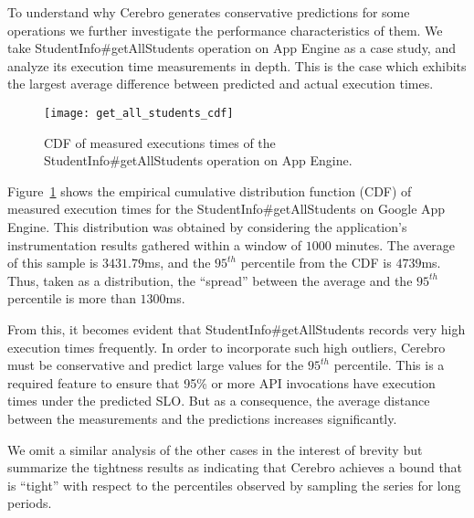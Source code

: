 To understand why Cerebro generates conservative predictions for some operations we further 
investigate the performance characteristics of them. We take StudentInfo\#getAllStudents
operation on App Engine as a case study, and analyze its execution time measurements in depth. 
This is the case which exhibits the largest average difference between predicted and actual execution times.

\begin{figure}
\centering
\texttt{[image: get\_all\_students\_cdf]}
\caption{CDF of measured executions times of the StudentInfo\#getAllStudents operation on App Engine.}
\label{fig:get_all_students_cdf}
\end{figure}

Figure~\ref{fig:get_all_students_cdf} shows the empirical cumulative
distribution function (CDF) of measured execution times for the 
StudentInfo\#getAllStudents on Google App Engine. 
This distribution was obtained by considering the application's instrumentation 
results gathered within a window of $1000$ minutes. 
The average of this sample is $3431.79$ms, and the $95^{th}$ percentile
from the CDF is $4739$ms.  Thus, taken as a distribution, the ``spread''
between the average and the $95^{th}$ percentile is more
than $1300$ms.  

From this, it becomes evident that StudentInfo\#getAll\-Students 
records very high execution times frequently. 
In order to incorporate such high outliers, Cerebro must be conservative 
and predict large values for
the $95^{th}$ percentile. This is a required feature to ensure that 95\% or more 
API invocations have
execution times under the predicted SLO. But as a consequence, the average 
distance between the 
measurements and the predictions increases significantly.

We omit a similar analysis of the other cases in the interest of brevity 
but summarize the tightness results as indicating that Cerebro achieves a
bound that is ``tight'' with respect to the percentiles observed by sampling
the series for long periods. 

